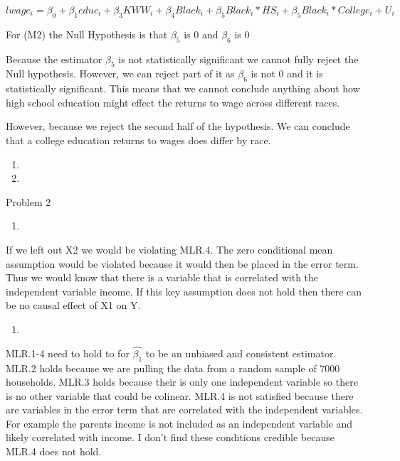 \documentclass[
  12pt,
  landscape]{article}
\begin{document}
\[
lwage_i = \beta_0 + \beta_1educ_i + \beta_3KWW_i + \beta_4Black_i + \beta_5Black_i*HS_i + \beta_5Black_i*College_i + U_i
\]

For (M2) the Null Hypothesis is that \({\beta_5}\) is 0 and
\({\beta_6}\) is 0

Because the estimator \({\beta_5}\) is not statistically significant we
cannot fully reject the Null hypothesis. However, we can reject part of
it as \({\beta_6}\) is not 0 and it is statistically significant. This
means that we cannot conclude anything about how high school education
might effect the returns to wage across different races.

However, because we reject the second half of the hypothesis. We can
conclude that a college education returns to wages does differ by race.

\begin{enumerate}
\def\labelenumi{(\alph{enumi})}
\setcounter{enumi}{11}
\item
\item
\end{enumerate}

Problem 2

\begin{enumerate}
\def\labelenumi{(\alph{enumi})}
\item
\end{enumerate}

If we left out X2 we would be violating MLR.4. The zero conditional mean
assumption would be violated because it would then be placed in the
error term. Thus we would know that there is a variable that is
correlated with the independent variable income. If this key assumption
does not hold then there can be no causal effect of X1 on Y.

\begin{enumerate}
\def\labelenumi{(\alph{enumi})}
\setcounter{enumi}{1}
\item
\end{enumerate}

MLR.1-4 need to hold to for \(\hat{\beta_1}\) to be an unbiased and
consistent estimator. MLR.2 holds because we are pulling the data from a
random sample of 7000 households. MLR.3 holds because their is only one
independent variable so there is no other variable that could be
colinear. MLR.4 is not satisfied because there are variables in the
error term that are correlated with the independent variables. For
example the parents income is not included as an independent variable
and likely correlated with income. I don't find these conditions
credible because MLR.4 does not hold.
\end{document}
